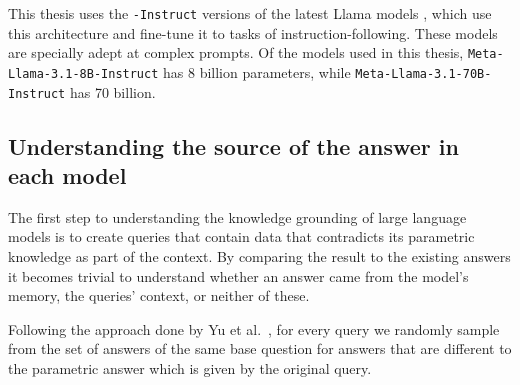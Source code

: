 This thesis uses the \texttt{-Instruct} versions of the latest Llama models \cite{llama3}, which use this architecture and fine-tune it to tasks of instruction-following.
These models are specially adept at complex prompts.
Of the models used in this thesis, \texttt{Meta-Llama-3.1-8B-Instruct} has 8 billion parameters, while \texttt{Meta-Llama-3.1-70B-Instruct} has 70 billion.

% 

\subsection{Understanding the source of the answer in each model}
\label{query_design}



The first step to understanding the knowledge grounding of large language models is to create queries that contain data that contradicts its parametric knowledge as part of the context.
By comparing the result to the existing answers it becomes trivial to understand whether an answer came from the model's memory, the queries' context, or neither of these.

Following the approach done by Yu et al.\ \cite{factual_recall}, for every query we randomly sample from the set of answers of the same base question for answers that are different to the parametric answer which is given by the original query.

